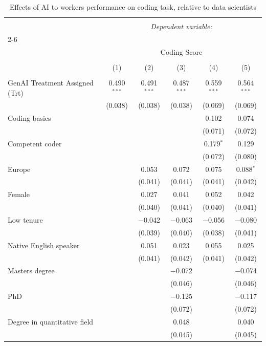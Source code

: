 
\begin{table}[!htbp] \centering 
  \caption{Effects of AI to workers performance on coding task, relative to data scientists} 
  \label{tab:robust_coding} 
\small 
\begin{tabular}{@{\extracolsep{-5pt}}lccccc} 
\\[-1.8ex]\hline 
\hline \\[-1.8ex] 
 & \multicolumn{5}{c}{\textit{Dependent variable:}} \\ 
\cline{2-6} 
\\[-1.8ex] & \multicolumn{5}{c}{Coding Score} \\ 
\\[-1.8ex] & (1) & (2) & (3) & (4) & (5)\\ 
\hline \\[-1.8ex] 
 GenAI Treatment Assigned (Trt) & 0.490$^{***}$ & 0.491$^{***}$ & 0.487$^{***}$ & 0.559$^{***}$ & 0.564$^{***}$ \\ 
  & (0.038) & (0.038) & (0.038) & (0.069) & (0.069) \\ 
  Coding basics &  &  &  & 0.102 & 0.074 \\ 
  &  &  &  & (0.071) & (0.072) \\ 
  Competent coder &  &  &  & 0.179$^{*}$ & 0.129 \\ 
  &  &  &  & (0.072) & (0.080) \\ 
  Europe &  & 0.053 & 0.072 & 0.075 & 0.088$^{*}$ \\ 
  &  & (0.041) & (0.041) & (0.041) & (0.042) \\ 
  Female &  & 0.027 & 0.041 & 0.052 & 0.042 \\ 
  &  & (0.040) & (0.041) & (0.040) & (0.041) \\ 
  Low tenure &  & $-$0.042 & $-$0.063 & $-$0.056 & $-$0.080 \\ 
  &  & (0.039) & (0.040) & (0.038) & (0.041) \\ 
  Native English speaker &  & 0.051 & 0.023 & 0.055 & 0.025 \\ 
  &  & (0.041) & (0.042) & (0.041) & (0.042) \\ 
  Masters degree &  &  & $-$0.072 &  & $-$0.074 \\ 
  &  &  & (0.046) &  & (0.046) \\ 
  PhD &  &  & $-$0.125 &  & $-$0.117 \\ 
  &  &  & (0.072) &  & (0.072) \\ 
  Degree in quantitative field &  &  & 0.048 &  & 0.040 \\ 
  &  &  & (0.045) &  & (0.045) \\ 

\end{tabular}
\end{table}
